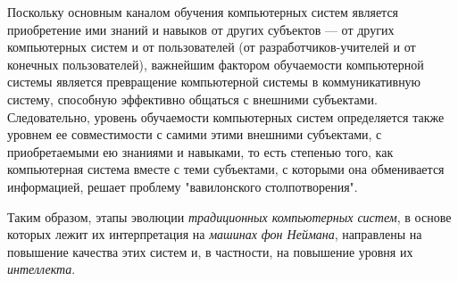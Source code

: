 Поскольку основным каналом обучения компьютерных систем является приобретение ими знаний и навыков от других субъектов --- от других компьютерных систем и от пользователей (от разработчиков-учителей и от конечных пользователей), важнейшим фактором обучаемости компьютерной системы является превращение компьютерной системы в коммуникативную систему, способную эффективно общаться с внешними субъектами. Следовательно, уровень обучаемости компьютерных систем определяется также уровнем ее совместимости с самими этими внешними субъектами, с приобретаемыми ею знаниями и навыками, то есть степенью того, как компьютерная система вместе с теми субъектами, с которыми она обменивается информацией, решает проблему "вавилонского столпотворения"{}.

Таким образом, этапы эволюции \textit{традиционных компьютерных систем}, в основе которых лежит их интерпретация на \textit{машинах фон Неймана}, направлены на повышение качества этих систем и, в частности, на повышение уровня их \textit{интеллекта}.

